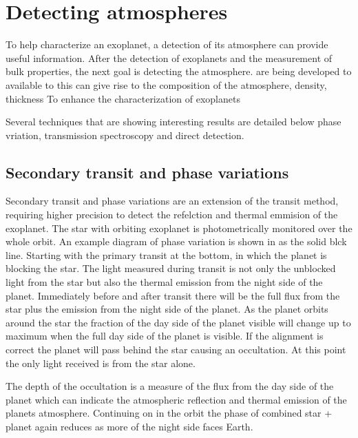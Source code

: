 






\section{Detecting atmospheres}
To help characterize an exoplanet, a detection of its atmosphere can provide useful information. After the detection of exoplanets and the measurement of bulk properties, the next goal is detecting the atmosphere.  are being developed to available to this can give rise to the composition of the atmosphere, density, thickness
To enhance the characterization of exoplanets

Several techniques that are showing interesting results are detailed below phase vriation, transmission spectroscopy and direct detection.

\subsection{Secondary transit and phase variations}

Secondary transit and phase variations are an extension of the transit method, requiring higher precision to detect the refelction and thermal emmision of the exoplanet. The star with orbiting exoplanet is photometrically monitored over the whole orbit. An example diagram of phase variation is shown in  as the solid blck line. Starting with the primary transit at the bottom, in which the planet is blocking the star. The light measured during transit is not only the unblocked light from the star but also the thermal emission from the night side of the planet. Immediately before and after transit there will be the full flux from the star plus the emission from the night side of the planet. As the planet orbits around the star the fraction of the day side of the planet visible will change up to maximum when the full day side of the planet is visible. If the alignment is correct the planet will pass behind the star causing an occultation. At this point the only light received is from the star alone.

The depth of the occultation is a measure of the flux from the day side of the planet which can indicate the atmospheric reflection and thermal emission of the planets atmosphere.
Continuing on in the orbit the phase of combined star + planet again reduces as more of the night side faces Earth.

